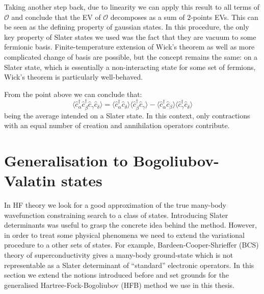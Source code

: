 Taking another step back, due to linearity we can apply this result to all terms of $\mathcal{O}$ and conclude that the EV of $\mathcal{O}$ decomposes as a sum of $2$-points EVs. This can be seen as the defining property of gaussian states. In this procedure, the only key property of Slater states we used was the fact that they are vacuum to some fermionic basis. Finite-temperature extension of Wick's theorem as well as more complicated change of basis are possible, but the concept remains the same: on a Slater state, which is essentially a non-interacting state for some set of fermions, Wick's theorem is particularly well-behaved.

From the point above we can conclude that:
\[
	\langle
	\hat c_\alpha^\dagger \hat c_\beta^\dagger \hat c_\gamma \hat c_\delta
	\rangle =
	\langle 
	\hat c_\alpha^\dagger \hat c_\delta
	\rangle \langle	
	\hat c_\beta^\dagger \hat c_\gamma 
	\rangle
	- 
	\langle 
	\hat c_\alpha^\dagger \hat c_\beta
	\rangle \langle	
	\hat c_\gamma^\dagger \hat c_\delta 
	\rangle
\]
being the average intended on a Slater state. In this context, only contractions with an equal number of creation and annihilation operators contribute.

\section{Generalisation to Bogoliubov-Valatin states}\label{appsec:bogoliubov-valatin}

In HF theory we look for a good approximation of the true many-body wavefunction constraining search to a class of states. Introducing Slater determinants was useful to grasp the concrete idea behind the method. However, in order to treat some physical phenomena we need to extend the variational procedure to a other sets of states. For example, Bardeen-Cooper-Shrieffer (BCS) theory of superconductivity gives a many-body ground-state which is not representable as a Slater determinant of ``standard'' electronic operators. In this section we extend the notions introduced before and set grounds for the generalised Hartree-Fock-Bogoliubov (HFB) method we use in this thesis.


